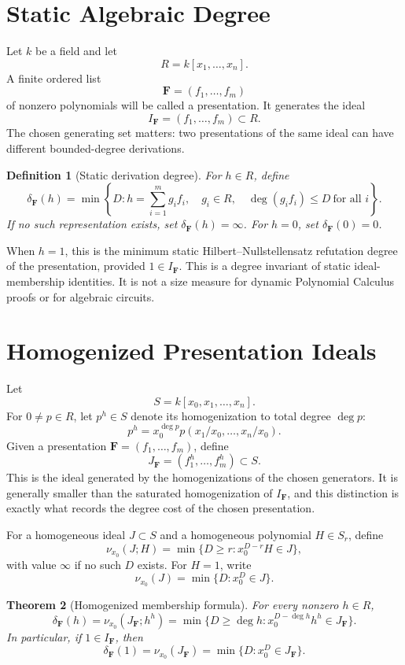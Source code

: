 \documentclass[11pt]{article}
\newtheorem{theorem}{Theorem}[section]
\newtheorem{definition}[theorem]{Definition}
\begin{document}
\section{Static Algebraic Degree}

Let \(k\) be a field and let
\[
R=k[x_1,\ldots,x_n].
\]
A finite ordered list
\[
\mathbf F=(f_1,\ldots,f_m)
\]
of nonzero polynomials will be called a presentation. It generates the ideal
\[
I_{\mathbf F}=(f_1,\ldots,f_m)\subset R.
\]
The chosen generating set matters: two presentations of the same ideal can have different bounded-degree derivations.

\begin{definition}[Static derivation degree]
For \(h\in R\), define
\[
\delta_{\mathbf F}(h)
=
\min
\left\{
D:
h=\sum_{i=1}^m g_i f_i,\quad
g_i\in R,\quad
\deg(g_i f_i)\le D\ \text{for all }i
\right\}.
\]
If no such representation exists, set \(\delta_{\mathbf F}(h)=\infty\). For \(h=0\), set \(\delta_{\mathbf F}(0)=0\).
\end{definition}

When \(h=1\), this is the minimum static Hilbert--Nullstellensatz refutation degree of the presentation, provided \(1\in I_{\mathbf F}\). This is a degree invariant of static ideal-membership identities. It is not a size measure for dynamic Polynomial Calculus proofs or for algebraic circuits.

\section{Homogenized Presentation Ideals}

Let
\[
S=k[x_0,x_1,\ldots,x_n].
\]
For \(0\ne p\in R\), let \(p^h\in S\) denote its homogenization to total degree \(\deg p\):
\[
p^h=x_0^{\deg p}p(x_1/x_0,\ldots,x_n/x_0).
\]
Given a presentation \(\mathbf F=(f_1,\ldots,f_m)\), define
\[
J_{\mathbf F}=(f_1^h,\ldots,f_m^h)\subset S.
\]
This is the ideal generated by the homogenizations of the chosen generators. It is generally smaller than the saturated homogenization of \(I_{\mathbf F}\), and this distinction is exactly what records the degree cost of the chosen presentation.

For a homogeneous ideal \(J\subset S\) and a homogeneous polynomial \(H\in S_r\), define
\[
\nu_{x_0}(J;H)
=
\min\{D\ge r:x_0^{D-r}H\in J\},
\]
with value \(\infty\) if no such \(D\) exists. For \(H=1\), write
\[
\nu_{x_0}(J)=\min\{D:x_0^D\in J\}.
\]

\begin{theorem}[Homogenized membership formula]
For every nonzero \(h\in R\),
\[
\delta_{\mathbf F}(h)
=
\nu_{x_0}(J_{\mathbf F};h^h)
=
\min\{D\ge \deg h:x_0^{D-\deg h}h^h\in J_{\mathbf F}\}.
\]
In particular, if \(1\in I_{\mathbf F}\), then
\[
\delta_{\mathbf F}(1)=\nu_{x_0}(J_{\mathbf F})
=
\min\{D:x_0^D\in J_{\mathbf F}\}.
\]
\end{theorem}
\end{document}
